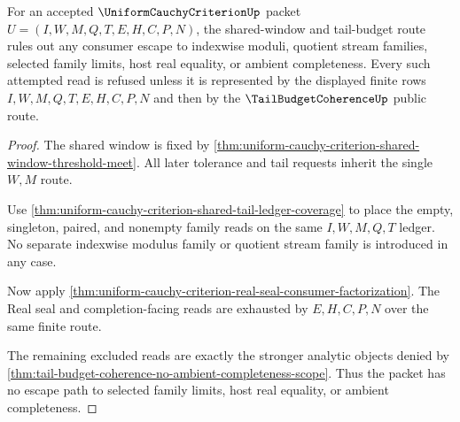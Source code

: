\begin{theorem}
\label{thm:uniform-cauchy-criterion-shared-window-nonescape}
For an accepted $\UniformCauchyCriterionUp$ packet $U=(I,W,M,Q,T,E,H,C,P,N)$, the shared-window and tail-budget route rules out any consumer escape to indexwise moduli, quotient stream families, selected family limits, host real equality, or ambient completeness. Every such attempted read is refused unless it is represented by the displayed finite rows $I,W,M,Q,T,E,H,C,P,N$ and then by the $\TailBudgetCoherenceUp$ public route.
\end{theorem}
\begin{proof}
The shared window is fixed by \autoref{thm:uniform-cauchy-criterion-shared-window-threshold-meet}. All later tolerance and tail requests inherit the single $W,M$ route.

Use \autoref{thm:uniform-cauchy-criterion-shared-tail-ledger-coverage} to place the empty, singleton, paired, and nonempty family reads on the same $I,W,M,Q,T$ ledger. No separate indexwise modulus family or quotient stream family is introduced in any case.

Now apply \autoref{thm:uniform-cauchy-criterion-real-seal-consumer-factorization}. The Real seal and completion-facing reads are exhausted by $E,H,C,P,N$ over the same finite route.

The remaining excluded reads are exactly the stronger analytic objects denied by \autoref{thm:tail-budget-coherence-no-ambient-completeness-scope}. Thus the packet has no escape path to selected family limits, host real equality, or ambient completeness.
\end{proof}

